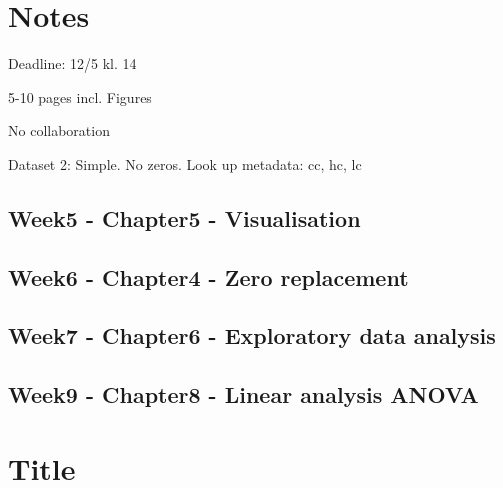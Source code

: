 \documentclass{article}
\begin{document}
\section{Notes}

Deadline: 12/5 kl. 14

5-10 pages incl. Figures

No collaboration


Dataset 2: Simple. No zeros. Look up metadata: cc, hc, lc \newline


 
\subsection{Week5 - Chapter5 - Visualisation} 
\subsection{Week6 - Chapter4 - Zero replacement} 
\subsection{Week7 - Chapter6 - Exploratory data analysis } 
\subsection{Week9 - Chapter8 - Linear analysis ANOVA} 


\section{Title}
\end{document}

